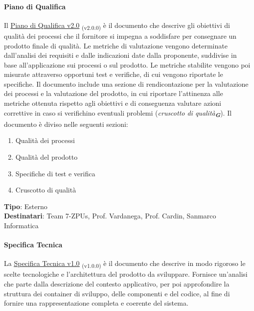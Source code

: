\documentclass[a4paper,12pt]{article}
\newcommand{\glossario}[1]{\textit{#1}\textsubscript{\textbf{\textit{\textcolor{lightblack}{G}}}}}
\newcommand{\ped}[1]{\textsubscript{#1}}
\begin{document}
\paragraph{Piano di Qualifica}\label{pianoDiQualifica}
Il
\href{https://7-zpus.github.io/Docs/assets/3_PB/DocumentiEsterni/PianoDiQualifica.pdf}{\ul{Piano
        di Qualifica v2.0}} \ped{(v2.0.0)} è il
documento che descrive gli obiettivi di qualità dei processi che il fornitore si impegna a
soddisfare per consegnare un prodotto finale di qualità. Le
metriche di valutazione vengono determinate dall'analisi dei
requisiti e dalle indicazioni date dalla proponente, suddivise in base
all'applicazione sui processi o sul prodotto. Le metriche stabilite vengono poi
misurate attraverso opportuni test e verifiche, di cui vengono riportate le
specifiche. Il documento include una sezione di rendicontazione per la
valutazione dei processi e la valutazione del prodotto, in cui riportare
l'attinenza alle metriche ottenuta rispetto agli obiettivi e di conseguenza
valutare azioni correttive in caso si verifichino eventuali problemi
(\glossario{cruscotto di qualità}). Il documento è diviso nelle seguenti
sezioni:
\begin{enumerate}
    \item Qualità dei processi
    \item Qualità del prodotto
    \item Specifiche di test e verifica
    \item Cruscotto di qualità
\end{enumerate}
\textbf{Tipo}: Esterno \\
\textbf{Destinatari}: Team 7-ZPUs, Prof. Vardanega, Prof. Cardin, Sanmarco Informatica \\

\paragraph{Specifica Tecnica}\label{specificaTecnica}
La \href{https://7-zpus.github.io/Docs/assets/3_PB/DocumentiEsterni/SpecificaTecnica.pdf}{\ul{Specifica Tecnica v1.0}} \ped{(v1.0.0)} è il documento che descrive in modo rigoroso le scelte tecnologiche e l'architettura del prodotto da sviluppare. Fornisce un'analisi che parte dalla descrizione del contesto applicativo, per poi
approfondire la struttura dei container di sviluppo, delle componenti e del codice, al fine di
fornire una rappresentazione completa e coerente del sistema.
\end{document}
